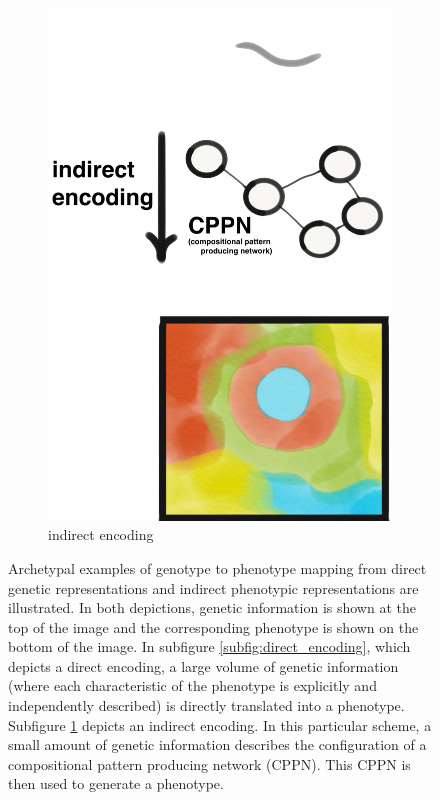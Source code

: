 \begin{figure}
\begin{subfigure}[b]{0.4\textwidth}
        \includegraphics[width=\textwidth]{img/regular_indirect_encoding.png}
        \caption{indirect encoding}
        \label{subfig:indirect_encoding}
    \end{subfigure}
    \hfill
  \captionsetup{singlelinecheck=off,justification=raggedright}
  \caption{Archetypal examples of genotype to phenotype mapping from direct genetic representations and indirect phenotypic representations are illustrated. In both depictions, genetic information is shown at the top of the image and the corresponding phenotype is shown on the bottom of the image. In subfigure \ref{subfig:direct_encoding}, which depicts a direct encoding, a large volume of genetic information (where each characteristic of the phenotype is explicitly and independently described) is directly translated into a phenotype. Subfigure \ref{subfig:indirect_encoding} depicts an indirect encoding. In this particular scheme, a small amount of genetic information describes the configuration of a compositional pattern producing network (CPPN). This CPPN is then used to generate a phenotype.}
  \label{fig:indirect_bias}
\end{figure}